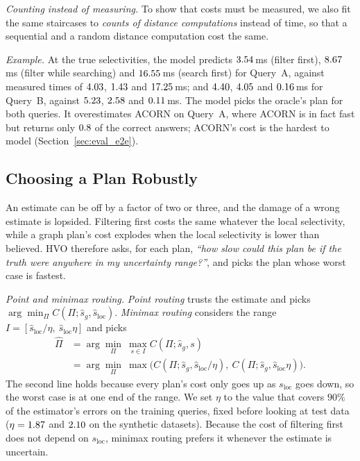 \documentclass[sigconf,nonacm]{acmart}
\newcommand{\sloc}{s_{\text{loc}}}
\begin{document}
\emph{Counting instead of measuring.} To show that costs must be measured, we also fit the same staircases to \emph{counts of distance computations} instead of time, so that a sequential and a random distance computation cost the same.

\emph{Example.} At the true selectivities, the model predicts $3.54$\,ms (filter first), $8.67$\,ms (filter while searching) and $16.55$\,ms (search first) for Query~A, against measured times of $4.03$, $1.43$ and $17.25$\,ms; and $4.40$, $4.05$ and $0.16$\,ms for Query~B, against $5.23$, $2.58$ and $0.11$\,ms. The model picks the oracle's plan for both queries. It overestimates ACORN on Query~A, where ACORN is in fact fast but returns only $0.8$ of the correct answers; ACORN's cost is the hardest to model (Section~\ref{sec:eval_e2e}).

\subsection{Choosing a Plan Robustly}\label{sec:route}
An estimate can be off by a factor of two or three, and the damage of a wrong estimate is lopsided. Filtering first costs the same whatever the local selectivity, while a graph plan's cost explodes when the local selectivity is lower than believed. HVO therefore asks, for each plan, \emph{``how slow could this plan be if the truth were anywhere in my uncertainty range?''}, and picks the plan whose worst case is fastest.

\emph{Point and minimax routing.} \emph{Point routing} trusts the estimate and picks $\arg\min_\Pi C(\Pi;\hat s_g,\hat s_{\text{loc}})$. \emph{Minimax routing} considers the range $I=[\hat s_{\text{loc}}/\eta,\ \hat s_{\text{loc}}\eta]$ and picks
\begin{equation}\label{eq:robust}
\begin{aligned}
\hat\Pi&=\arg\min_\Pi\ \max_{s\in I}C(\Pi;\hat s_g,s)\\
&=\arg\min_\Pi\ \max\big(C(\Pi;\hat s_g,\hat s_{\text{loc}}/\eta),\ C(\Pi;\hat s_g,\hat s_{\text{loc}}\eta)\big).
\end{aligned}
\end{equation}
The second line holds because every plan's cost only goes up as $\sloc$ goes down, so the worst case is at one end of the range. We set $\eta$ to the value that covers $90\%$ of the estimator's errors on the training queries, fixed before looking at test data ($\eta=1.87$ and $2.10$ on the synthetic datasets). Because the cost of filtering first does not depend on $\sloc$, minimax routing prefers it whenever the estimate is uncertain.
\end{document}
